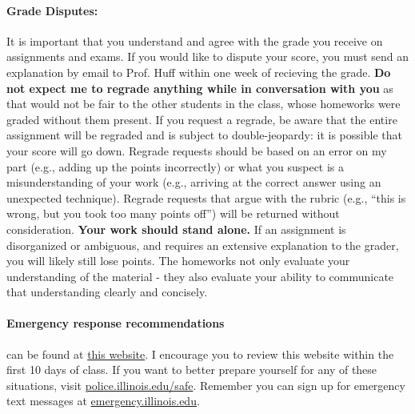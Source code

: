 \documentclass[11pt, a4paper]{article}
\begin{document}
\paragraph{Grade Disputes:} It is important that you understand and agree
        with the grade you receive on assignments and exams. If you would like
        to dispute your score, you must send an explanation by email to Prof.
        Huff within one week of recieving the grade.
        \textbf{Do not expect me to regrade anything while in conversation with
        you} as that would not be fair to the other students in the class, whose
        homeworks were graded without them present.  If you request a regrade,
        be aware that the entire assignment will be regraded and is subject to
        double-jeopardy: it is possible that your score will go down.
        Regrade requests should be based on an error on my part (e.g., adding
        up the points incorrectly) or what you suspect is a misunderstanding of
        your work (e.g., arriving at the correct answer using an unexpected
        technique). Regrade requests that argue with the rubric (e.g., ``this is
        wrong, but you took too many points off'') will be returned without
        consideration.
        \textbf{Your work should stand alone.} If an assignment is disorganized or
        ambiguous, and requires an extensive explanation to the grader, you
        will likely still lose points. The homeworks not only evaluate your
        understanding of the material - they also evaluate your ability to
        communicate that understanding clearly and concisely.
\paragraph{Emergency response recommendations} can be found at 
        \href{https://police.illinois.edu/emergency-management/preparedness/emergency-response-guide/}{this website}. 
        I encourage you to review this website within the first 10 days of class.  If you want to 
        better prepare yourself for any of these situations, visit 
        \href{http://police.illinois.edu/safe}{police.illinois.edu/safe}. Remember you can sign up for emergency 
        text messages at \href{http://emergency.illinois.edu}{emergency.illinois.edu}.
\end{document}
